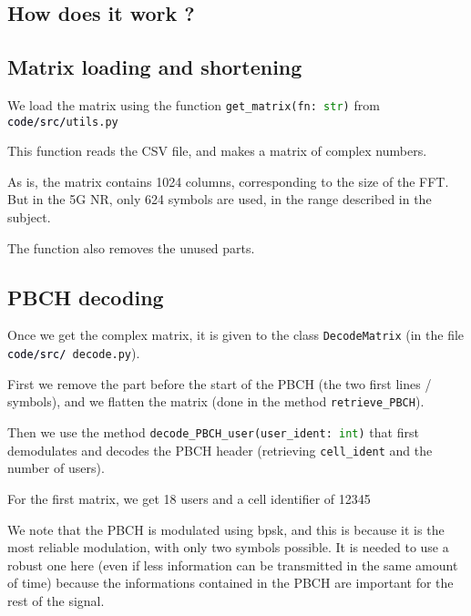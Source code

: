 \documentclass[a4paper, 12pt, twoside]{article}
\begin{document}
    \begin{indt}{\section{How does it work ?}}%
        \begin{indt}{\subsection{Matrix loading and shortening}} %
            We load the matrix using the function \lstinline[language=python]{get_matrix(fn: str)} from \texttt{\textcolor{00f}{code/src/}utils.py}

            This function reads the CSV file, and makes a matrix of complex numbers.

            As is, the matrix contains 1024 columns, corresponding to the size of the FFT.
            But in the 5G NR, only 624 symbols are used, in the range described in the subject.

            The function also removes the unused parts.
        \end{indt} %

        \begin{indt}{\subsection{PBCH decoding}} %
            Once we get the complex matrix, it is given to the class \lstinline[language=python]{DecodeMatrix} (in the file \texttt{\textcolor{00f}{code/src/ }decode.py}).

            First we remove the part before the start of the PBCH (the two first lines / symbols), and we flatten the matrix (done in the method \lstinline[language=python]{retrieve_PBCH}).

            Then we use the method \lstinline[language=python]{decode_PBCH_user(user_ident: int)} that first demodulates and decodes the PBCH header (retrieving \texttt{cell\_ident} and the number of users).

            For the first matrix, we get 18 users and a cell identifier of 12345

            We note that the PBCH is modulated using bpsk, and this is because it is the most reliable modulation, with only two symbols possible. It is needed to use a robust one here (even if less information can be transmitted in the same amount of time) because the informations contained in the PBCH are important for the rest of the signal.


\end{indt}
\end{indt}
\end{document}
